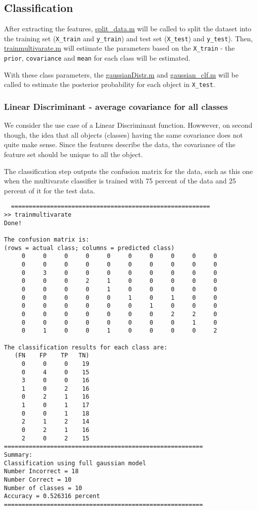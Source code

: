 \documentclass[main.tex]{subfiles}
\begin{document}
\subsection{Classification}
After extracting the features, \hyperlink{splitdata}{split\_data.m} will be called to split the dataset into the training set (\texttt{X\_train} and \texttt{y\_train}) and test set (\texttt{X\_test}) and \texttt{y\_test}). Then,
 \hyperlink{trainmultivarate}{trainmultivarate.m} will estimate the parameters based on the \texttt{X\_train} - the \texttt{prior}, \texttt{covariance} and \texttt{mean} for each class will be estimated.

 With these class parameters, the \hyperlink{gaussianDistr}{gaussianDistr.m} and \hyperlink{gaussianclf}{gaussian\_clf.m} will be called to estimate the posterior probability for each object in \texttt{X\_test}.

 \subsubsection*{Linear Discriminant - average covariance for all classes}
We consider the use case of a Linear Discriminant function. Howwever, on second though, the idea that all objects (classes) having the same covariance does not quite make sense. Since the features describe the data, the covariance of the feature set should be unique to all the object.

The classification step outputs the confusion matrix for the data, such as this one when the multivarate classifier is trained with 75 percent of the data and 25 percent of it for the test data.

\begin{verbatim}
  ========================================================
>> trainmultivarate
Done!

The confusion matrix is:
(rows = actual class; columns = predicted class)
     0     0     0     0     0     0     0     0     0     0
     0     0     0     0     0     0     0     0     0     0
     0     3     0     0     0     0     0     0     0     0
     0     0     0     2     1     0     0     0     0     0
     0     0     0     0     1     0     0     0     0     0
     0     0     0     0     0     1     0     1     0     0
     0     0     0     0     0     0     1     0     0     0
     0     0     0     0     0     0     0     2     2     0
     0     0     0     0     0     0     0     0     1     0
     0     1     0     0     1     0     0     0     0     2

The classification results for each class are:
   (FN    FP    TP   TN)
     0     0     0    19
     0     4     0    15
     3     0     0    16
     1     0     2    16
     0     2     1    16
     1     0     1    17
     0     0     1    18
     2     1     2    14
     0     2     1    16
     2     0     2    15
========================================================
Summary:
Classification using full gaussian model
Number Incorrect = 18
Number Correct = 10
Number of classes = 10
Accuracy = 0.526316 percent
========================================================
\end{verbatim}
\end{document}
